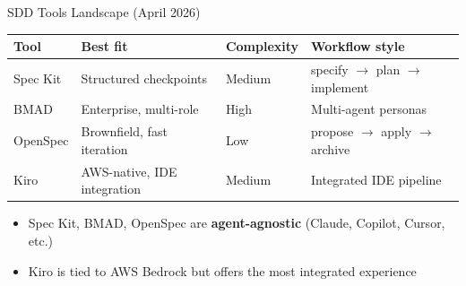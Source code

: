 \documentclass[aspectratio=169]{beamer}
\begin{document}
\begin{frame}{SDD Tools Landscape (April 2026)}
    \vspace{0.2cm}
    \begin{center}
        \small
        \begin{tabular}{l l l l}
            \toprule
            \textbf{Tool} & \textbf{Best fit} & \textbf{Complexity} & \textbf{Workflow style} \\
            \midrule
            Spec Kit & Structured checkpoints & Medium & specify $\to$ plan $\to$ implement \\
            BMAD & Enterprise, multi-role & High & Multi-agent personas \\
            OpenSpec & Brownfield, fast iteration & Low & propose $\to$ apply $\to$ archive \\
            Kiro & AWS-native, IDE integration & Medium & Integrated IDE pipeline \\
            \bottomrule
        \end{tabular}
    \end{center}

    \vspace{0.4cm}
    \begin{itemize}
        \item Spec Kit, BMAD, OpenSpec are \textbf{agent-agnostic} (Claude, Copilot, Cursor, etc.)
        \item Kiro is tied to AWS Bedrock but offers the most integrated experience
    \end{itemize}
\end{frame}
\end{document}
